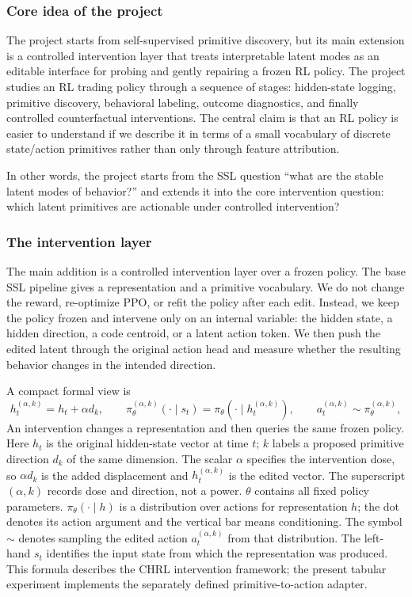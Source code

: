 \documentclass[11pt,a4paper]{article}
\begin{document}
\subsubsection{Core idea of the project}
The project starts from self-supervised primitive discovery, but its main extension is a controlled intervention layer that treats interpretable latent modes as an editable interface for probing and gently repairing a frozen RL policy. The project studies an RL trading policy through a sequence of stages: hidden-state logging, primitive discovery, behavioral labeling, outcome diagnostics, and finally controlled counterfactual interventions. The central claim is that an RL policy is easier to understand if we describe it in terms of a small vocabulary of discrete state/action primitives rather than only through feature attribution.

In other words, the project starts from the SSL question ``what are the stable latent modes of behavior?'' and extends it into the core intervention question: which latent primitives are actionable under controlled intervention?

\subsubsection{The intervention layer}
The main addition is a controlled intervention layer over a frozen policy. The base SSL pipeline gives a representation and a primitive vocabulary. We do not change the reward, re-optimize PPO, or refit the policy after each edit. Instead, we keep the policy frozen and intervene only on an internal variable: the hidden state, a hidden direction, a code centroid, or a latent action token. We then push the edited latent through the original action head and measure whether the resulting behavior changes in the intended direction.

A compact formal view is
\begin{equation}
h_t^{(\alpha,k)} = h_t + \alpha d_k,
\qquad
\pi_\theta^{(\alpha,k)}(\cdot\mid s_t)=\pi_\theta(\cdot\mid h_t^{(\alpha,k)}),
\qquad
a_t^{(\alpha,k)}\sim\pi_\theta^{(\alpha,k)},
\label{eq:intervention}
\end{equation}
An intervention changes a representation and then queries the same frozen policy.
Here $h_t$ is the original hidden-state vector at time $t$; $k$ labels a proposed primitive direction $d_k$ of the same dimension. The scalar $\alpha$ specifies the intervention dose, so $\alpha d_k$ is the added displacement and $h_t^{(\alpha,k)}$ is the edited vector. The superscript $(\alpha,k)$ records dose and direction, not a power. $\theta$ contains all fixed policy parameters. $\pi_\theta(\cdot\mid h)$ is a distribution over actions for representation $h$; the dot denotes its action argument and the vertical bar means conditioning. The symbol $\sim$ denotes sampling the edited action $a_t^{(\alpha,k)}$ from that distribution. The left-hand $s_t$ identifies the input state from which the representation was produced. This formula describes the CHRL intervention framework; the present tabular experiment implements the separately defined primitive-to-action adapter.
\end{document}
